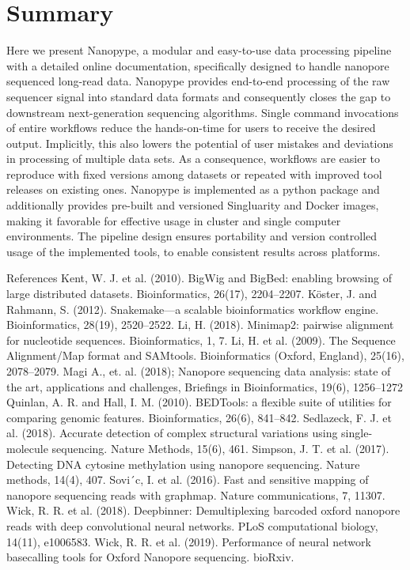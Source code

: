 \section{Summary}
\label{sec:nanopype:summary}
Here we present Nanopype, a modular and easy-to-use data processing pipeline with a detailed online documentation, specifically designed to handle nanopore sequenced long-read data.
Nanopype provides end-to-end processing of the raw sequencer signal into standard data formats and consequently closes the gap to downstream next-generation sequencing algorithms. Single command invocations of entire workflows reduce the hands-on-time for users to receive the desired output. Implicitly, this also lowers the potential of user mistakes and deviations in processing of multiple data sets. As a consequence, workflows are easier to reproduce with fixed versions among datasets or repeated with improved tool releases on existing ones.
Nanopype is implemented as a python package and additionally provides pre-built and versioned Singluarity and Docker images, making it favorable for effective usage in cluster and single computer environments. The pipeline design ensures portability and version controlled usage of the implemented tools, to enable consistent results across platforms.



References
Kent, W. J. et al. (2010). BigWig and BigBed: enabling browsing of large distributed datasets. Bioinformatics, 26(17), 2204–2207.
Köster, J. and Rahmann, S. (2012). Snakemake—a scalable bioinformatics workflow engine. Bioinformatics, 28(19), 2520–2522.
Li, H. (2018). Minimap2: pairwise alignment for nucleotide sequences. Bioinformatics, 1, 7.
Li, H. et al. (2009). The Sequence Alignment/Map format and SAMtools. Bioinformatics (Oxford, England), 25(16), 2078–2079.
Magi A., et. al. (2018); Nanopore sequencing data analysis: state of the art, applications and challenges, Briefings in Bioinformatics, 19(6), 1256–1272
Quinlan, A. R. and Hall, I. M. (2010). BEDTools: a flexible suite of utilities for comparing genomic features. Bioinformatics, 26(6), 841–842.
Sedlazeck, F. J. et al. (2018). Accurate detection of complex structural variations using single-molecule sequencing. Nature Methods, 15(6), 461.
Simpson, J. T. et al. (2017). Detecting DNA cytosine methylation using nanopore sequencing. Nature methods, 14(4), 407.
Sovi´c, I. et al. (2016). Fast and sensitive mapping of nanopore sequencing reads with graphmap. Nature communications, 7, 11307.
Wick, R. R. et al. (2018). Deepbinner: Demultiplexing barcoded oxford nanopore reads with deep convolutional neural networks. PLoS computational biology, 14(11), e1006583. 
Wick, R. R. et al. (2019). Performance of neural network basecalling tools for Oxford Nanopore sequencing. bioRxiv.

